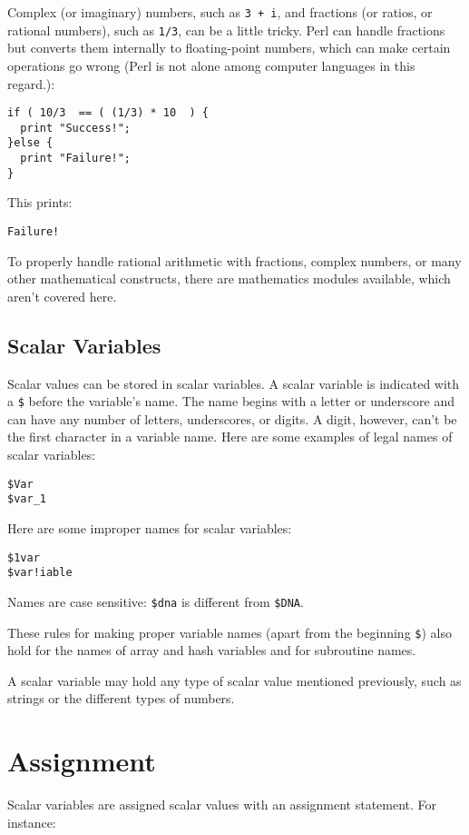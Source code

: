 Complex (or imaginary) numbers, such as \verb|3 + i|, and fractions (or ratios,
or rational numbers), such as \verb|1/3|, can be a little tricky. Perl can
handle fractions but converts them internally to floating-point numbers,
which can make certain operations go wrong (Perl is not alone among
computer languages in this regard.):

\begin{lstlisting}
if ( 10/3  == ( (1/3) * 10  ) {
  print "Success!";
}else {
  print "Failure!";
}
\end{lstlisting}

This prints:

\begin{lstlisting}
Failure!
\end{lstlisting}

To properly handle rational arithmetic with fractions, complex numbers, or many other mathematical constructs, there are mathematics modules available, which aren't covered here.

\subsection{Scalar Variables}
Scalar values can be stored in scalar variables. A scalar variable is indicated with a \verb|$| before the variable's name. The name begins with a letter or underscore and can have any number of letters, underscores, or digits. A digit, however, can't be the first character in a variable name. Here are some examples of legal names of scalar variables:

\begin{lstlisting}
$Var
$var_1
\end{lstlisting}

Here are some improper names for scalar variables:

\begin{lstlisting}
$1var
$var!iable
\end{lstlisting}

Names are case sensitive: \verb|$dna| is different from \verb|$DNA|.

These rules for making proper variable names (apart from the beginning \verb|$|) also hold for the names of array and hash variables and for subroutine names.

A scalar variable may hold any type of scalar value mentioned previously, such as strings or the different types of numbers.

\section{Assignment}
Scalar variables are assigned scalar values with an assignment statement. For instance:

